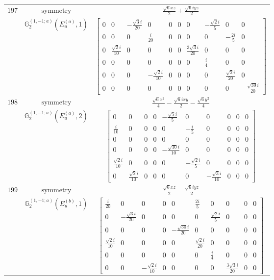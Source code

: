 \documentclass[fleqn,8pt,landscape]{jsarticle}
\begin{document}
\begin{longtable}{ccc}
$ 197 $ & $ \text{symmetry} $ & $ \frac{\sqrt{6} x z}{2} + \frac{\sqrt{6} i y z}{2} $ \\
$  $ & $ \mathbb{G}_{2}^{(1,-1;a)}(E_{u}^{(a)},1) $ & $ \begin{bmatrix} 0 & 0 & - \frac{\sqrt{3} i}{20} & 0 & 0 & 0 & 0 & - \frac{\sqrt{2} i}{5} & 0 & 0 \\ 0 & 0 & 0 & \frac{i}{20} & 0 & 0 & 0 & 0 & - \frac{2 i}{5} & 0 \\ 0 & \frac{\sqrt{2} i}{10} & 0 & 0 & 0 & 0 & \frac{3 \sqrt{3} i}{20} & 0 & 0 & 0 \\ 0 & 0 & 0 & 0 & 0 & 0 & 0 & \frac{i}{4} & 0 & 0 \\ 0 & 0 & 0 & - \frac{\sqrt{2} i}{10} & 0 & 0 & 0 & 0 & \frac{\sqrt{2} i}{20} & 0 \\ 0 & 0 & 0 & 0 & 0 & 0 & 0 & 0 & 0 & - \frac{\sqrt{30} i}{20} \end{bmatrix} $ \\ \hline
$ 198 $ & $ \text{symmetry} $ & $ \frac{\sqrt{6} x^{2}}{4} - \frac{\sqrt{6} i x y}{2} - \frac{\sqrt{6} y^{2}}{4} $ \\
$  $ & $ \mathbb{G}_{2}^{(1,-1;a)}(E_{u}^{(a)},2) $ & $ \begin{bmatrix} 0 & 0 & 0 & 0 & - \frac{\sqrt{5} i}{5} & 0 & 0 & 0 & 0 & 0 \\ \frac{i}{10} & 0 & 0 & 0 & 0 & - \frac{i}{5} & 0 & 0 & 0 & 0 \\ 0 & 0 & 0 & 0 & 0 & 0 & 0 & 0 & 0 & 0 \\ 0 & 0 & 0 & 0 & - \frac{\sqrt{10} i}{10} & 0 & 0 & 0 & 0 & 0 \\ \frac{\sqrt{2} i}{10} & 0 & 0 & 0 & 0 & - \frac{\sqrt{2} i}{5} & 0 & 0 & 0 & 0 \\ 0 & \frac{\sqrt{2} i}{10} & 0 & 0 & 0 & 0 & - \frac{\sqrt{3} i}{10} & 0 & 0 & 0 \end{bmatrix} $ \\ \hline
$ 199 $ & $ \text{symmetry} $ & $ \frac{\sqrt{6} x z}{2} - \frac{\sqrt{6} i y z}{2} $ \\
$  $ & $ \mathbb{G}_{2}^{(1,-1;a)}(E_{u}^{(b)},1) $ & $ \begin{bmatrix} \frac{i}{20} & 0 & 0 & 0 & 0 & \frac{2 i}{5} & 0 & 0 & 0 & 0 \\ 0 & - \frac{\sqrt{3} i}{20} & 0 & 0 & 0 & 0 & \frac{\sqrt{2} i}{5} & 0 & 0 & 0 \\ 0 & 0 & 0 & 0 & - \frac{\sqrt{30} i}{20} & 0 & 0 & 0 & 0 & 0 \\ \frac{\sqrt{2} i}{10} & 0 & 0 & 0 & 0 & \frac{\sqrt{2} i}{20} & 0 & 0 & 0 & 0 \\ 0 & 0 & 0 & 0 & 0 & 0 & \frac{i}{4} & 0 & 0 & 0 \\ 0 & 0 & - \frac{\sqrt{2} i}{10} & 0 & 0 & 0 & 0 & \frac{3 \sqrt{3} i}{20} & 0 & 0 \end{bmatrix} $ \\ \hline

\end{longtable}
\end{document}
